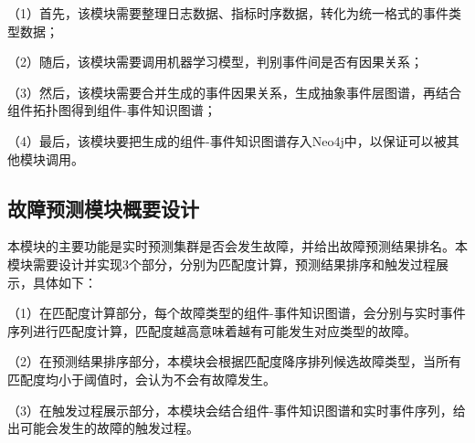 （1）首先，该模块需要整理日志数据、指标时序数据，转化为统一格式的事件类型数据；

（2）随后，该模块需要调用机器学习模型，判别事件间是否有因果关系；

（3）然后，该模块需要合并生成的事件因果关系，生成抽象事件层图谱，再结合组件拓扑图得到组件-事件知识图谱；

（4）最后，该模块要把生成的组件-事件知识图谱存入Neo4j中，以保证可以被其他模块调用。

\subsection{故障预测模块概要设计}
本模块的主要功能是实时预测集群是否会发生故障，并给出故障预测结果排名。本模块需要设计并实现3个部分，分别为匹配度计算，预测结果排序和触发过程展示，具体如下：

（1）在匹配度计算部分，每个故障类型的组件-事件知识图谱，会分别与实时事件序列进行匹配度计算，匹配度越高意味着越有可能发生对应类型的故障。

（2）在预测结果排序部分，本模块会根据匹配度降序排列候选故障类型，当所有匹配度均小于阈值时，会认为不会有故障发生。

（3）在触发过程展示部分，本模块会结合组件-事件知识图谱和实时事件序列，给出可能会发生的故障的触发过程。

